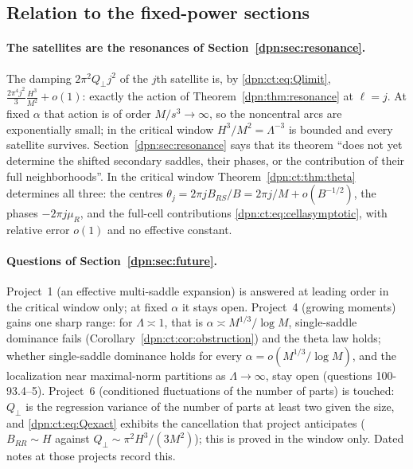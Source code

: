 \documentclass[11pt]{article}
\numberwithin{equation}{section}
\theoremstyle{definition}\newtheorem{definition}[theorem]{Definition}
\theoremstyle{remark}\newtheorem{remark}[theorem]{Remark}
\begin{document}
\subsection{Relation to the fixed-power sections}\label{dpn:ct:sec:relation}
\paragraph{The satellites are the resonances of Section~\ref{dpn:sec:resonance}.}
The damping $2\pi^2Q_\perp j^2$ of the $j$th satellite is, by
\eqref{dpn:ct:eq:Qlimit},
$\frac{2\pi^4j^2}3\frac{H^3}{M^2}+o(1)$: exactly the action of
Theorem~\ref{dpn:thm:resonance} at $\ell=j$.  At fixed $\alpha$ that action is
of order $M/s^3\to\infty$, so the noncentral arcs are exponentially small; in
the critical window $H^3/M^2=\Lambda^{-3}$ is bounded and every satellite
survives.  Section~\ref{dpn:sec:resonance} says that its theorem ``does not
yet determine the shifted secondary saddles, their phases, or the
contribution of their full neighborhoods''.  In the critical window
Theorem~\ref{dpn:ct:thm:theta} determines all three: the centres
$\theta_j=2\pi jB_{RS}/B=2\pi j/M+o(B^{-1/2})$, the phases $-2\pi j\mu_R$, and the
full-cell contributions \eqref{dpn:ct:eq:cellasymptotic}, with relative error
$o(1)$ and no effective constant.

\paragraph{Questions of Section~\ref{dpn:sec:future}.}
Project~1 (an effective multi-saddle expansion) is answered at leading
order in the critical window only; at fixed $\alpha$ it stays open.
Project~4 (growing moments) gains one sharp range: for $\Lambda\asymp1$, that
is $\alpha\asymp M^{1/3}/\log M$, single-saddle dominance fails
(Corollary~\ref{dpn:ct:cor:obstruction}) and the theta law holds; whether
single-saddle dominance holds for every $\alpha=o(M^{1/3}/\log M)$, and the
localization near maximal-norm partitions as $\Lambda\to\infty$, stay open
(questions 100-93.4--5).  Project~6 (conditioned fluctuations of the number of
parts) is touched: $Q_\perp$ is the regression variance of the number of parts
at least two given the size, and \eqref{dpn:ct:eq:Qexact} exhibits the
cancellation that project anticipates ($B_{RR}\sim H$ against
$Q_\perp\sim\pi^2H^3/(3M^2)$); this is proved in the window only.  Dated notes at
those projects record this.
\end{document}
